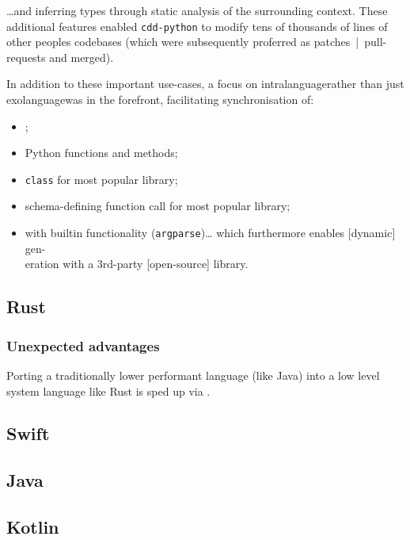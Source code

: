 \ldots{}and inferring types through static analysis of the surrounding context. These additional features enabled \texttt{cdd-python} to modify tens of thousands of lines of other peoples codebases (which were subsequently proferred as patches~|~pull-requests and merged).

In addition to these important use-cases, a focus on intralanguage\textemdash{}rather than just exolanguage\textemdash{}was in the forefront, facilitating synchronisation of:

\begin{itemize}
    \item {};
    \item Python functions and methods;
    \item {} \texttt{class} for most popular  library;
    \item {} schema-defining function call for most popular  library;
    \item {} with builtin functionality (\texttt{argparse})\ldots{} which furthermore enables [dynamic]  gen-\\eration with a 3rd-party [open-source] library.
\end{itemize} 

\subsection{Rust}

\subsubsection{Unexpected advantages}
Porting a traditionally lower performant language (like Java) into a low level system language like Rust is sped up via .

\subsection{Swift}

\subsection{Java}

\subsection{Kotlin}

